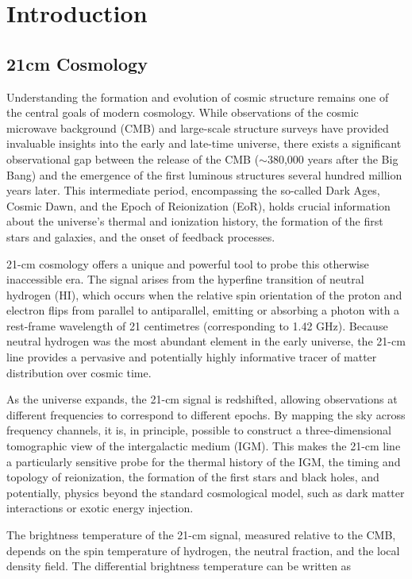 \documentclass[floats,floatfix,showpacs,amssymb,prd,superscriptaddress,nofootinbib]{revtex4-2} %
\begin{document}

\newpage

{\small \tableofcontents}
\newpage
\section{Introduction}
\subsection{21cm Cosmology}
Understanding the formation and evolution of cosmic structure remains one of the central goals of modern cosmology. While observations of the cosmic microwave background (CMB) and large-scale structure surveys have provided invaluable insights into the early and late-time universe, there exists a significant observational gap between the release of the CMB ($\sim$380,000 years after the Big Bang) and the emergence of the first luminous structures several hundred million years later. This intermediate period, encompassing the so-called Dark Ages, Cosmic Dawn, and the Epoch of Reionization (EoR), holds crucial information about the universe's thermal and ionization history, the formation of the first stars and galaxies, and the onset of feedback processes.

21-cm cosmology offers a unique and powerful tool to probe this otherwise inaccessible era. The signal arises from the hyperfine transition of neutral hydrogen (HI), which occurs when the relative spin orientation of the proton and electron flips from parallel to antiparallel, emitting or absorbing a photon with a rest-frame wavelength of 21 centimetres (corresponding to 1.42 GHz). Because neutral hydrogen was the most abundant element in the early universe, the 21-cm line provides a pervasive and potentially highly informative tracer of matter distribution over cosmic time.

As the universe expands, the 21-cm signal is redshifted, allowing observations at different frequencies to correspond to different epochs. By mapping the sky across frequency channels, it is, in principle, possible to construct a three-dimensional tomographic view of the intergalactic medium (IGM). This makes the 21-cm line a particularly sensitive probe for the thermal history of the IGM, the timing and topology of reionization, the formation of the first stars and black holes, and potentially, physics beyond the standard cosmological model, such as dark matter interactions or exotic energy injection.

The brightness temperature of the 21-cm signal, measured relative to the CMB, depends on the spin temperature of hydrogen, the neutral fraction, and the local density field. The differential brightness temperature can be written as \citep{Pritchard_Loeb_2012}
\end{document}

